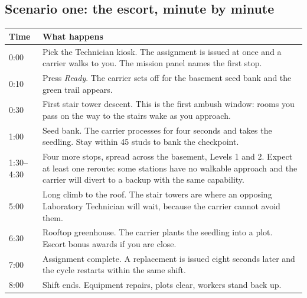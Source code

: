 \subsection{Scenario one: the escort, minute by minute}
\begin{center}
\begin{tabular}{@{}p{}p{}@{}}
\toprule
\textbf{Time} & \textbf{What happens} \\
\midrule
0:00 & Pick the Technician kiosk. The assignment is issued at once and a carrier walks to you. The mission panel names the first stop. \\
0:10 & Press \emph{Ready}. The carrier sets off for the basement seed bank and the green trail appears. \\
0:30 & First stair tower descent. This is the first ambush window: rooms you pass on the way to the stairs wake as you approach. \\
1:00 & Seed bank. The carrier processes for four seconds and takes the seedling. Stay within 45 studs to bank the checkpoint. \\
1:30--4:30 & Four more stops, spread across the basement, Levels 1 and 2. Expect at least one reroute: some stations have no walkable approach and the carrier will divert to a backup with the same capability. \\
5:00 & Long climb to the roof. The stair towers are where an opposing Laboratory Technician will wait, because the carrier cannot avoid them. \\
6:30 & Rooftop greenhouse. The carrier plants the seedling into a plot. Escort bonus awards if you are close. \\
7:00 & Assignment complete. A replacement is issued eight seconds later and the cycle restarts within the same shift. \\
8:00 & Shift ends. Equipment repairs, plots clear, workers stand back up. \\
\bottomrule
\end{tabular}
\end{center}

